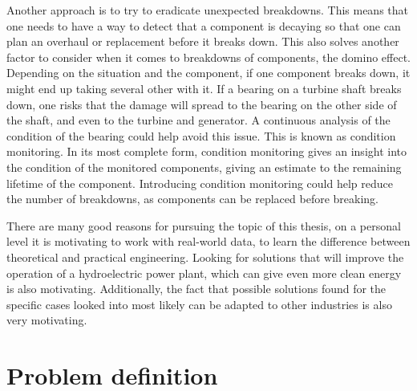 Another approach is to try to eradicate unexpected breakdowns. This means that one needs to have a way to detect that a component is decaying so that one can plan an overhaul or replacement before it breaks down. This also solves another factor to consider when it comes to breakdowns of components, the domino effect. Depending on the situation and the component, if one component breaks down, it might end up taking several other with it. If a bearing on a turbine shaft breaks down, one risks that the damage will spread to the bearing on the other side of the shaft, and even to the turbine and generator. A continuous analysis of the condition of the bearing could help avoid this issue. This is known as condition monitoring. In its most complete form, condition monitoring gives an insight into the condition of the monitored components, giving an estimate to the remaining lifetime of the component. Introducing condition monitoring could help reduce the number of breakdowns, as components can be replaced before breaking.

There are many good reasons for pursuing the topic of this thesis, on a personal level it is motivating to work with real-world data, to learn the difference between theoretical and practical engineering. Looking for solutions that will improve the operation of a hydroelectric power plant, which can give even more clean energy is also motivating. Additionally, the fact that possible solutions found for the specific cases looked into most likely can be adapted to other industries is also very motivating. 




    


\section{Problem definition}

